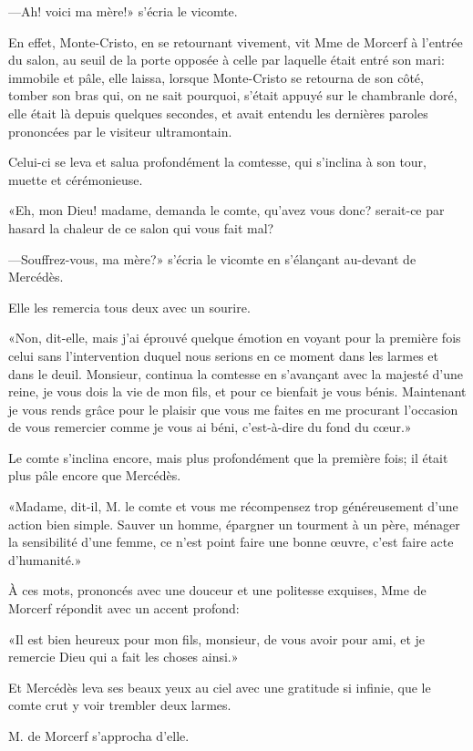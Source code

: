 —Ah! voici ma mère!» s'écria le vicomte. 

En effet, Monte-Cristo, en se retournant vivement, vit Mme de Morcerf à l'entrée du salon, au seuil de la porte opposée à celle par laquelle était entré son mari: immobile et pâle, elle laissa, lorsque Monte-Cristo se retourna de son côté, tomber son bras qui, on ne sait pourquoi, s'était appuyé sur le chambranle doré, elle était là depuis quelques secondes, et avait entendu les dernières paroles prononcées par le visiteur ultramontain. 

Celui-ci se leva et salua profondément la comtesse, qui s'inclina à son tour, muette et cérémonieuse. 

«Eh, mon Dieu! madame, demanda le comte, qu'avez vous donc? serait-ce par hasard la chaleur de ce salon qui vous fait mal? 

—Souffrez-vous, ma mère?» s'écria le vicomte en s'élançant au-devant de Mercédès. 

Elle les remercia tous deux avec un sourire. 

«Non, dit-elle, mais j'ai éprouvé quelque émotion en voyant pour la première fois celui sans l'intervention duquel nous serions en ce moment dans les larmes et dans le deuil. Monsieur, continua la comtesse en s'avançant avec la majesté d'une reine, je vous dois la vie de mon fils, et pour ce bienfait je vous bénis. Maintenant je vous rends grâce pour le plaisir que vous me faites en me procurant l'occasion de vous remercier comme je vous ai béni, c'est-à-dire du fond du cœur.» 

Le comte s'inclina encore, mais plus profondément que la première fois; il était plus pâle encore que Mercédès. 

«Madame, dit-il, M. le comte et vous me récompensez trop généreusement d'une action bien simple. Sauver un homme, épargner un tourment à un père, ménager la sensibilité d'une femme, ce n'est point faire une bonne œuvre, c'est faire acte d'humanité.» 

À ces mots, prononcés avec une douceur et une politesse exquises, Mme de Morcerf répondit avec un accent profond: 

«Il est bien heureux pour mon fils, monsieur, de vous avoir pour ami, et je remercie Dieu qui a fait les choses ainsi.» 

Et Mercédès leva ses beaux yeux au ciel avec une gratitude si infinie, que le comte crut y voir trembler deux larmes. 

M. de Morcerf s'approcha d'elle. 

